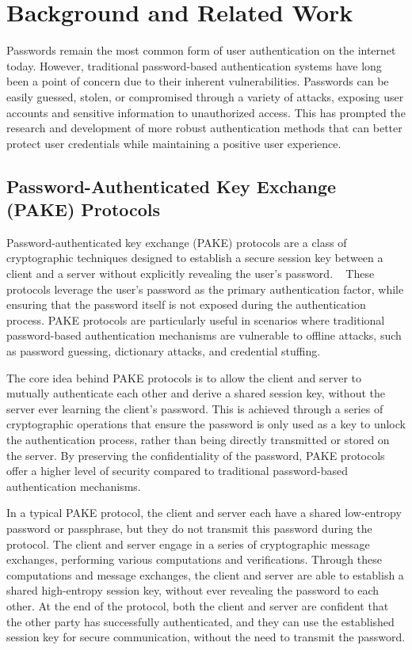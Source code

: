 \section{Background and Related Work}
\label{sec:relwork}

Passwords remain the most common form of user authentication on the internet today. However, traditional password-based authentication systems have long been a point of concern due to their inherent vulnerabilities. Passwords can be easily guessed, stolen, or compromised through a variety of attacks, exposing user accounts and sensitive information to unauthorized access. This has prompted the research and development of more robust authentication methods that can better protect user credentials while maintaining a positive user experience.

\subsection{Password-Authenticated Key Exchange (PAKE) Protocols}
\label{sec:pake}

Password-authenticated key exchange (PAKE) protocols are a class of cryptographic techniques designed to establish a secure session key between a client and a server without explicitly revealing the user's password. ~\cite{hao2022sokpake} These protocols leverage the user's password as the primary authentication factor, while ensuring that the password itself is not exposed during the authentication process. PAKE protocols are particularly useful in scenarios where traditional password-based authentication mechanisms are vulnerable to offline attacks, such as password guessing, dictionary attacks, and credential stuffing.

The core idea behind PAKE protocols is to allow the client and server to mutually authenticate each other and derive a shared session key, without the server ever learning the client's password. This is achieved through a series of cryptographic operations that ensure the password is only used as a key to unlock the authentication process, rather than being directly transmitted or stored on the server. By preserving the confidentiality of the password, PAKE protocols offer a higher level of security compared to traditional password-based authentication mechanisms.

In a typical PAKE protocol, the client and server each have a shared low-entropy password or passphrase, but they do not transmit this password during the protocol. The client and server engage in a series of cryptographic message exchanges, performing various computations and verifications. Through these computations and message exchanges, the client and server are able to establish a shared high-entropy session key, without ever revealing the password to each other. At the end of the protocol, both the client and server are confident that the other party has successfully authenticated, and they can use the established session key for secure communication, without the need to transmit the password.


